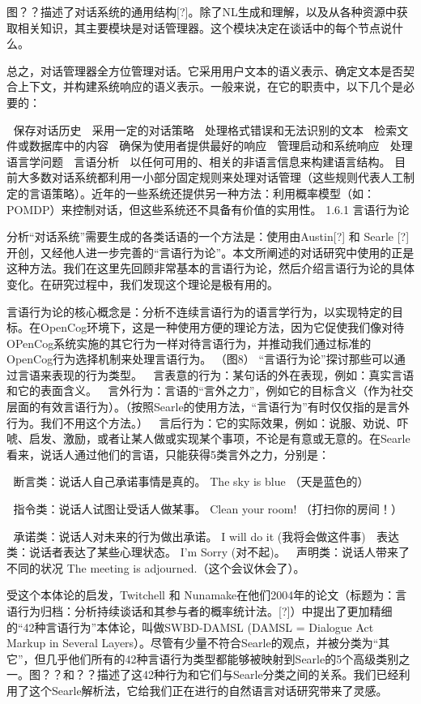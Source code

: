 图？？描述了对话系统的通用结构[?]。除了NL生成和理解，以及从各种资源中获取相关知识，其主要模块是对话管理器。这个模块决定在谈话中的每个节点说什么。



总之，对话管理器全方位管理对话。它采用用户文本的语义表示、确定文本是否契合上下文，并构建系统响应的语义表示。一般来说，在它的职责中，以下几个是必要的：

	保存对话历史
	采用一定的对话策略
	处理格式错误和无法识别的文本
	检索文件或数据库中的内容
	确保为使用者提供最好的响应
	管理启动和系统响应
	处理语言学问题
	言语分析
	以任何可用的、相关的非语言信息来构建语言结构。
目前大多数对话系统都利用一小部分固定规则来处理对话管理（这些规则代表人工制定的言语策略）。近年的一些系统还提供另一种方法：利用概率模型（如：POMDP）来控制对话，但这些系统还不具备有价值的实用性。
1.6.1 言语行为论

分析“对话系统”需要生成的各类话语的一个方法是：使用由Austin[?] 和 Searle [?] 开创，又经他人进一步完善的“言语行为论”。本文所阐述的对话研究中使用的正是这种方法。我们在这里先回顾非常基本的言语行为论，然后介绍言语行为论的具体变化。在研究过程中，我们发现这个理论是极有用的。

言语行为论的核心概念是：分析不连续言语行为的语言学行为，以实现特定的目标。在OpenCog环境下，这是一种使用方便的理论方法，因为它促使我们像对待OPenCog系统实施的其它行为一样对待言语行为，并推动我们通过标准的OpenCog行为选择机制来处理言语行为。
（图8）
“言语行为论”探讨那些可以通过言语来表现的行为类型。
	言表意的行为：某句话的外在表现，例如：真实言语和它的表面含义。
	言外行为：言语的“言外之力”，例如它的目标含义（作为社交层面的有效言语行为）。（按照Searle的使用方法，“言语行为”有时仅仅指的是言外行为。我们不用这个方法。）
	言后行为：它的实际效果，例如：说服、劝说、吓唬、启发、激励，或者让某人做或实现某个事项，不论是有意或无意的。在Searle看来，说话人通过他们的言语，只能获得5类言外之力，分别是：

	断言类：说话人自己承诺事情是真的。
The sky is blue （天是蓝色的）

	指令类：说话人试图让受话人做某事。
Clean your room! （打扫你的房间！）


	承诺类：说话人对未来的行为做出承诺。
I will do it (我将会做这件事)
	表达类：说话者表达了某些心理状态。
I’m Sorry (对不起)。
	声明类：说话人带来了不同的状况
The meeting is adjourned.（这个会议休会了）。

受这个本体论的启发，Twitchell 和 Nunamake在他们2004年的论文（标题为：言语行为归档：分析持续谈话和其参与者的概率统计法。[?]）中提出了更加精细的“42种言语行为”本体论，叫做SWBD-DAMSL (DAMSL = Dialogue Act Markup in Several Layers）。尽管有少量不符合Searle的观点，并被分类为“其它”，但几乎他们所有的42种言语行为类型都能够被映射到Searle的5个高级类别之一。图？？和？？描述了这42种行为和它们与Searle分类之间的关系。我们已经利用了这个Searle解析法，它给我们正在进行的自然语言对话研究带来了灵感。

